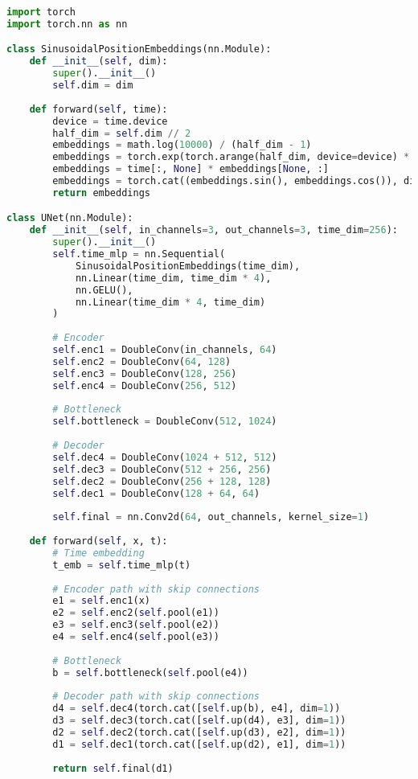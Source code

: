 \documentclass[11pt,a4paper]{article}
\theoremstyle{definition}
\begin{document}
\begin{lstlisting}[language=Python, caption=U-Net Architecture for DDPM]
import torch
import torch.nn as nn

class SinusoidalPositionEmbeddings(nn.Module):
    def __init__(self, dim):
        super().__init__()
        self.dim = dim
    
    def forward(self, time):
        device = time.device
        half_dim = self.dim // 2
        embeddings = math.log(10000) / (half_dim - 1)
        embeddings = torch.exp(torch.arange(half_dim, device=device) * -embeddings)
        embeddings = time[:, None] * embeddings[None, :]
        embeddings = torch.cat((embeddings.sin(), embeddings.cos()), dim=-1)
        return embeddings

class UNet(nn.Module):
    def __init__(self, in_channels=3, out_channels=3, time_dim=256):
        super().__init__()
        self.time_mlp = nn.Sequential(
            SinusoidalPositionEmbeddings(time_dim),
            nn.Linear(time_dim, time_dim * 4),
            nn.GELU(),
            nn.Linear(time_dim * 4, time_dim)
        )
        
        # Encoder
        self.enc1 = DoubleConv(in_channels, 64)
        self.enc2 = DoubleConv(64, 128)
        self.enc3 = DoubleConv(128, 256)
        self.enc4 = DoubleConv(256, 512)
        
        # Bottleneck
        self.bottleneck = DoubleConv(512, 1024)
        
        # Decoder
        self.dec4 = DoubleConv(1024 + 512, 512)
        self.dec3 = DoubleConv(512 + 256, 256)
        self.dec2 = DoubleConv(256 + 128, 128)
        self.dec1 = DoubleConv(128 + 64, 64)
        
        self.final = nn.Conv2d(64, out_channels, kernel_size=1)
    
    def forward(self, x, t):
        # Time embedding
        t_emb = self.time_mlp(t)
        
        # Encoder path with skip connections
        e1 = self.enc1(x)
        e2 = self.enc2(self.pool(e1))
        e3 = self.enc3(self.pool(e2))
        e4 = self.enc4(self.pool(e3))
        
        # Bottleneck
        b = self.bottleneck(self.pool(e4))
        
        # Decoder path with skip connections
        d4 = self.dec4(torch.cat([self.up(b), e4], dim=1))
        d3 = self.dec3(torch.cat([self.up(d4), e3], dim=1))
        d2 = self.dec2(torch.cat([self.up(d3), e2], dim=1))
        d1 = self.dec1(torch.cat([self.up(d2), e1], dim=1))
        
        return self.final(d1)
\end{lstlisting}
\end{document}
